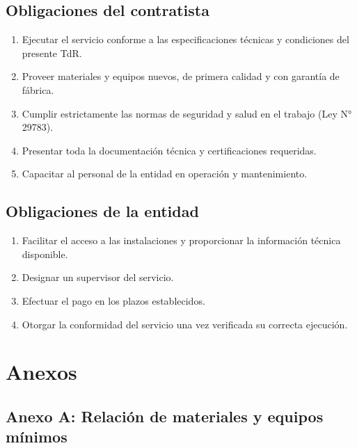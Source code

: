 \documentclass[12pt,a4paper]{article}
\begin{document}
\subsection{Obligaciones del contratista}

\begin{enumerate}
  \item Ejecutar el servicio conforme a las especificaciones técnicas y condiciones del presente TdR.
  \item Proveer materiales y equipos nuevos, de primera calidad y con garantía de fábrica.
  \item Cumplir estrictamente las normas de seguridad y salud en el trabajo (Ley N° 29783).
  \item Presentar toda la documentación técnica y certificaciones requeridas.
  \item Capacitar al personal de la entidad en operación y mantenimiento.
\end{enumerate}

\subsection{Obligaciones de la entidad}

\begin{enumerate}
  \item Facilitar el acceso a las instalaciones y proporcionar la información técnica disponible.
  \item Designar un supervisor del servicio.
  \item Efectuar el pago en los plazos establecidos.
  \item Otorgar la conformidad del servicio una vez verificada su correcta ejecución.
\end{enumerate}

\section{Anexos}

\subsection{Anexo A: Relación de materiales y equipos mínimos}
\end{document}
